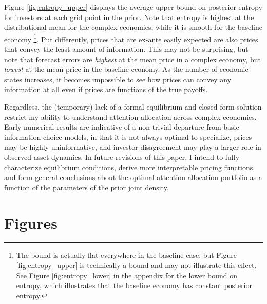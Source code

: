 \documentclass{article}
\begin{document}
Figure \ref{fig:entropy_upper} displays the average upper bound on posterior entropy for investors at each grid point in the prior. Note that entropy is highest at the distributional mean for the complex economies, while it is smooth for the baseline economy \footnote{The bound is actually flat everywhere in the baseline case, but Figure \ref{fig:entropy_upper} is technically a bound and may not illustrate this effect. See Figure \ref{fig:entropy_lower} in the appendix for the lower bound on entropy, which illustrates that the baseline economy has constant posterior entropy.}. Put differently, prices that are ex-ante easily expected are also prices that convey the least amount of information. This may not be surprising, but note that forecast errors are \textit{highest} at the mean price in a complex economy, but \textit{lowest} at the mean price in the baseline economy. As the number of economic states increases, it becomes impossible to see how prices can convey any information at all even if prices are functions of the true payoffs.

Regardless, the (temporary) lack of a formal equilibrium and closed-form solution restrict my ability to understand attention allocation across complex economies. Early numerical results are indicative of a non-trivial departure from basic information choice models, in that it is not always optimal to specialize, prices may be highly uninformative, and investor disagreement may play a larger role in observed asset dynamics. In future revisions of this paper, I intend to fully characterize equilibrium conditions, derive more interpretable pricing functions, and form general conclusions about the optimal attention allocation portfolio as a function of the parameters of the prior joint density.

\newpage
\printbibliography

\newpage
\appendix
\pagebreak

\section{Figures}
\end{document}
